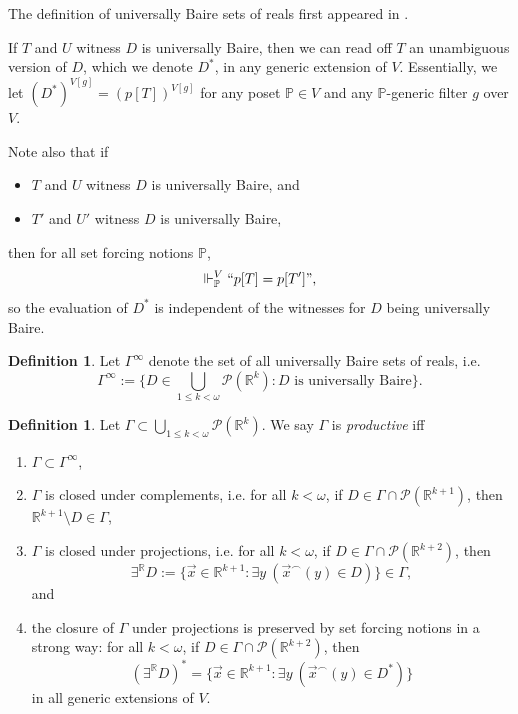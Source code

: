 \documentclass[12pt, twoside]{memoir}
\numberwithin{equation}{section}
\theoremstyle{definition}
\newtheorem{defi}[thm]{Definition}
\theoremstyle{remark}
\theoremstyle{definition}
\theoremstyle{definition}
\theoremstyle{definition}
\theoremstyle{remark}
\begin{document}
The definition of universally Baire sets of reals first appeared in \cite[Section 2]{fmw}. 

If $T$ and $U$ witness $D$ is universally Baire, then we can read off $T$ an unambiguous version of $D$, which we denote $D^*$, in any generic extension of $V$. Essentially, we let $(D^*)^{V[g]} = (p[T])^{V[g]}$ for any poset $\mathbb{P} \in V$ and any $\mathbb{P}$-generic filter $g$ over $V$.

Note also that if
\begin{itemize}
    \item $T$ and $U$ witness $D$ is universally Baire, and
    \item $T'$ and $U'$ witness $D$ is universally Baire,
\end{itemize}
then for all set forcing notions $\mathbb{P}$, 
\begin{equation*}
    \Vdash^V_{\mathbb{P}} ``p[T] = p[T']",
\end{equation*}
so the evaluation of $D^*$ is independent of the witnesses for $D$ being universally Baire.

\begin{defi}
Let $\Gamma^{\infty}$ denote the set of all universally Baire sets of reals, i.e. 
\begin{equation*}
    \Gamma^{\infty} := \{D \in \bigcup_{1 \leq k < \omega} \mathcal{P}(\mathbb{R}^k) : D \text{ is universally Baire}\}.
\end{equation*}
\end{defi}

\begin{defi}
Let $\Gamma \subset \bigcup_{1 \leq k < \omega} \mathcal{P}(\mathbb{R}^k)$. We say $\Gamma$ is \emph{productive} iff
\begin{enumerate}[label=(\alph*)]
    \item $\Gamma \subset \Gamma^{\infty}$,
    \item $\Gamma$ is closed under complements, i.e. for all $k < \omega$, if $D \in \Gamma \cap \mathcal{P}(\mathbb{R}^{k+1})$, then $\mathbb{R}^{k+1} \setminus D \in \Gamma$,
    \item $\Gamma$ is closed under projections, i.e. for all $k < \omega$, if $D \in \Gamma \cap \mathcal{P}(\mathbb{R}^{k+2})$, then
    \begin{equation*}
        \exists^{\mathbb{R}} D := \{\Vec{x} \in \mathbb{R}^{k+1} : \exists y \ (\Vec{x}^{\frown}(y) \in D)\} \in \Gamma,
    \end{equation*}
    and
    \item the closure of $\Gamma$ under projections is preserved by set forcing notions in a strong way: for all $k < \omega$, if $D \in \Gamma \cap \mathcal{P}(\mathbb{R}^{k+2})$, then
    \begin{equation*}
        (\exists^{\mathbb{R}} D)^* = \{\Vec{x} \in \mathbb{R}^{k+1} : \exists y \ (\Vec{x}^{\frown}(y) \in D^*)\}
    \end{equation*}
    in all generic extensions of $V$.
\end{enumerate}
\end{defi}
\end{document}
